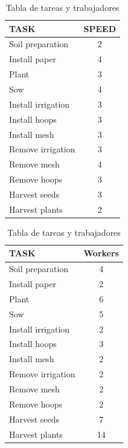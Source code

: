 \begin{table}[ht!]
    \centering
    \begin{minipage}{0.48\textwidth}
        \centering
        \begin{tabular}{|l|c|}
            \hline
            \rowcolor{gray!30} \textbf{\textcolor{grey3}{TASK}} & \textbf{\textcolor{grey3}{SPEED}} \\ 
            \hline
            Soil preparation   & 2  \\ \hline
            Install paper      & 4  \\ \hline
            Plant              & 3  \\ \hline
            Sow                & 4  \\ \hline
            Install irrigation & 3  \\ \hline
            Install hoops      & 3  \\ \hline
            Install mesh       & 3  \\ \hline
            Remove irrigation  & 3  \\ \hline
            Remove mesh        & 4  \\ \hline
            Remove hoops       & 3  \\ \hline
            Harvest seeds      & 3  \\ \hline
            Harvest plants     & 2  \\ 
            \hline
        \end{tabular}
        \caption{Tabla de tareas y velocidades}
        \label{tab:tareas}
    \end{minipage}
    \hfill
    \begin{minipage}{0.48\textwidth}
        \centering
        \begin{tabular}{|l|c|}
            \hline
            \rowcolor{gray!30} \textbf{\textcolor{grey3}{TASK}} & \textbf{\textcolor{grey3}{Workers}} \\ 
            \hline
            Soil preparation   & 4  \\ \hline
            Install paper      & 2  \\ \hline
            Plant              & 6  \\ \hline
            Sow                & 5  \\ \hline
            Install irrigation & 2 \\ \hline
            Install hoops      & 3  \\ \hline
            Install mesh       & 2  \\ \hline
            Remove irrigation  & 2 \\ \hline
            Remove mesh        & 2  \\ \hline
            Remove hoops       & 2 \\ \hline
            Harvest seeds      & 7  \\ \hline
            Harvest plants     & 14  \\ 
            \hline
        \end{tabular}
        \caption{Tabla de tareas y trabajadores}
        \label{tab:trabajadores}
    \end{minipage}
\end{table}
